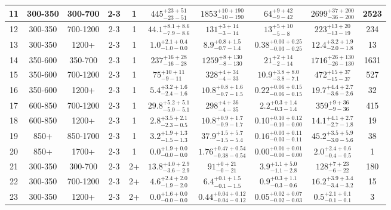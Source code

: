 \documentclass[11pt, oneside]{article}
\begin{document}
\begin{table}
{\begin{tabular}{ |c|c|c|c|c||c|c|c||c|c| }
11 & 300-350 & 300-700 & 2-3 & 1 & $445^{+23+51}_{-23-51}$ & $1853^{+10+190}_{-10-190}$ & $64^{+ 9+42}_{- 9-42}$ & $2699^{+37+200}_{-36-200}$ & 2523 \\ \hline
12 & 300-350 & 700-1200 & 2-3 & 1 & $44.1^{+8.1+8.6}_{-7.9-8.6}$ & $131^{+ 3+14}_{- 3-14}$ & $13^{+ 5+10}_{- 5- 8}$ & $223^{+13+20}_{-13-19}$ & 234 \\ \hline
13 & 300-350 & 1200+ & 2-3 & 1 & $1.0^{+2.1+0.4}_{-1.0-0.0}$ & $8.9^{+0.8+1.5}_{-0.7-1.4}$ & $0.38^{+0.03+0.25}_{-0.03-0.25}$ & $12.4^{+3.2+1.9}_{-2.0-1.8}$ & 13 \\ \hline
14 & 350-600 & 350-700 & 2-3 & 1 & $237^{+16+28}_{-16-28}$ & $1259^{+ 8+130}_{- 8-130}$ & $21^{+ 2+14}_{- 2-14}$ & $1716^{+26+130}_{-26-130}$ & 1631 \\ \hline
15 & 350-600 & 700-1200 & 2-3 & 1 & $75^{+10+11}_{- 9-11}$ & $328^{+ 4+34}_{- 4-33}$ & $10.9^{+3.8+8.0}_{-3.8-7.1}$ & $472^{+15+37}_{-15-37}$ & 527 \\ \hline
16 & 350-600 & 1200+ & 2-3 & 1 & $5.4^{+3.2+1.6}_{-2.4-1.6}$ & $10.8^{+0.8+1.6}_{-0.7-1.5}$ & $0.22^{+0.06+0.15}_{-0.06-0.15}$ & $19.7^{+4.4+2.7}_{-3.6-2.6}$ & 32 \\ \hline
17 & 600-850 & 700-1200 & 2-3 & 1 & $29.8^{+5.2+5.1}_{-5.0-5.1}$ & $298^{+ 4+36}_{- 4-35}$ & $2.2^{+0.3+1.4}_{-0.3-1.4}$ & $359^{+ 9+36}_{- 9-36}$ & 415 \\ \hline
18 & 600-850 & 1200+ & 2-3 & 1 & $2.8^{+3.5+2.1}_{-2.3-0.5}$ & $10.8^{+0.9+1.7}_{-0.9-1.7}$ & $0.10^{+0.10+0.12}_{-0.10-0.00}$ & $14.1^{+4.1+2.7}_{-2.7-1.8}$ & 19 \\ \hline
19 & 850+ & 850-1700 & 2-3 & 1 & $3.2^{+1.9+1.3}_{-1.5-1.3}$ & $37.9^{+1.5+5.7}_{-1.5-5.4}$ & $0.16^{+0.03+0.11}_{-0.03-0.11}$ & $45.2^{+3.5+5.9}_{-3.0-5.6}$ & 38 \\ \hline
20 & 850+ & 1700+ & 2-3 & 1 & $0.0^{+1.9+0.0}_{-0.0-0.0}$ & $1.76^{+0.47+0.54}_{-0.38-0.54}$ & $0.00^{+0.01+0.01}_{-0.00-0.00}$ & $2.0^{+2.4+0.6}_{-0.4-0.5}$ & 1 \\ \hline
21 & 300-350 & 300-700 & 2-3 & 2+ & $13.8^{+4.0+2.9}_{-3.6-2.9}$ & $91^{+ 0+21}_{- 0-21}$ & $3.9^{+1.1+5.0}_{-1.1-2.8}$ & $128^{+ 7+23}_{- 6-22}$ & 180 \\ \hline
22 & 300-350 & 700-1200 & 2-3 & 2+ & $4.6^{+2.4+2.0}_{-1.9-2.0}$ & $6.4^{+0.1+1.5}_{-0.1-1.5}$ & $0.9^{+0.3+1.1}_{-0.3-0.6}$ & $16.2^{+3.9+3.4}_{-3.4-3.2}$ & 15 \\ \hline
23 & 300-350 & 1200+ & 2-3 & 2+ & $0.0^{+1.6+0.0}_{-0.0-0.0}$ & $0.44^{+0.04+0.12}_{-0.04-0.12}$ & $0.05^{+0.02+0.07}_{-0.02-0.03}$ & $0.5^{+2.1+0.1}_{-0.1-0.1}$ & 3 \\ \hline

\end{tabular}}
\end{table}
\end{document}
